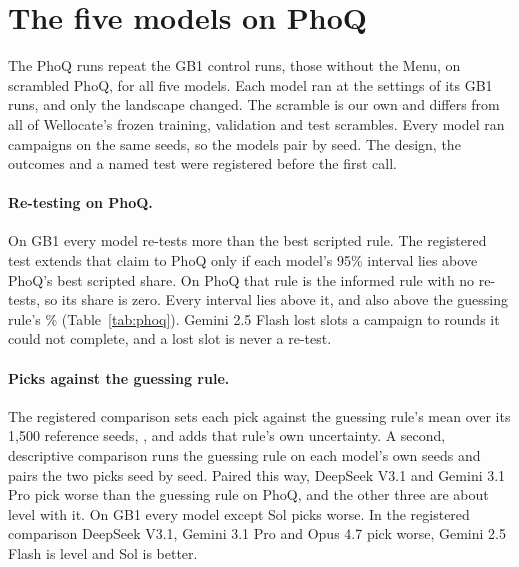 \section{The five models on PhoQ}
\label{app:phoq}

The PhoQ runs repeat the GB1 control runs, those without the Menu, on scrambled PhoQ, for all five models. Each model ran at the settings of its GB1 runs, and only the landscape changed. The scramble is our own and differs from all of Wellocate's frozen
training, validation and test scrambles. Every model ran \nPqNOpus{} campaigns on the same seeds, so the models pair by
seed. The design, the outcomes and a named test were registered before the first call.

\paragraph{Re-testing on PhoQ.} On GB1 every model re-tests more than the best scripted rule. The registered test
extends that claim to PhoQ only if each model's 95\% interval lies above PhoQ's best scripted share. On PhoQ that
rule is the informed rule with no re-tests, so its share is zero. Every interval lies above it, and also above the
guessing rule's \nPqGuessShare\% (Table~\ref{tab:phoq}). Gemini 2.5 Flash lost \nPqFlashLostRounds{} slots a campaign
to rounds it could not complete, and a lost slot is never a re-test.

\paragraph{Picks against the guessing rule.} The registered comparison sets each pick against the guessing rule's mean
over its 1{,}500 reference seeds, \nPqGuessPick, and adds that rule's own uncertainty. A second, descriptive comparison
runs the guessing rule on each model's own seeds and pairs the two picks seed by seed. Paired this way, DeepSeek V3.1
and Gemini 3.1 Pro pick worse than the guessing rule on PhoQ, and the other three are about level with it. On GB1
every model except Sol picks worse. In the registered comparison DeepSeek V3.1, Gemini 3.1 Pro and Opus 4.7 pick worse, Gemini 2.5 Flash is level and Sol is better.

